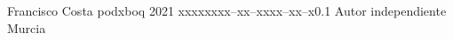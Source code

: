 \documentclass{tstextbook}
\begin{document}
    {Francisco Costa}
    {podxboq}
    {2021}
    {xxxxx}{xxx--xx--xxxx--xx--x}{0.1}
    {Autor independiente}
    {Murcia}









    \printbibliography{}
    \printindex
\end{document}
